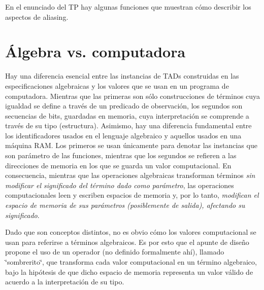 En el enunciado del TP hay algunas funciones que muestran cómo describir los aspectos de aliasing.\hypertarget{Aliasing_sec-puntero}{}\section{Álgebra vs. computadora}\label{Aliasing_sec-puntero}
Hay una diferencia esencial entre las instancias de T\+A\+Ds construidas en las especificaciones algebraicas y los valores que se usan en un programa de computadora. Mientras que las primeras son sólo construcciones de términos cuya igualdad se define a través de un predicado de observación, los segundos son secuencias de bits, guardadas en memoria, cuya interpretación se comprende a través de su tipo (estructura). Asimismo, hay una diferencia fundamental entre los identificadores usados en el lenguaje algebraico y aquellos usados en una máquina R\+AM. Los primeros se usan únicamente para denotar las instancias que son parámetro de las funciones, mientras que los segundos se refieren a las direcciones de memoria en los que se guarda un valor computacional. En consecuencia, mientras que las operaciones algebraicas transforman términos {\itshape sin modificar el significado del término dado como parámetro}, las operaciones computacionales leen y escriben espacios de memoria y, por lo tanto, {\itshape modifican el espacio de memoria de sus parámetros (posiblemente de salida), afectando su significado}.

Dado que son conceptos distintos, no es obvio cómo los valores computacional se usan para referirse a términos algebraicos. Es por esto que el apunte de diseño propone el uso de un operador (no definido formalmente ahí), llamado \char`\"{}sombrerito\char`\"{}, que transforma cada valor computacional en un término algebraico, bajo la hipótesis de que dicho espacio de memoria representa un valor válido de acuerdo a la interpretación de su tipo.

